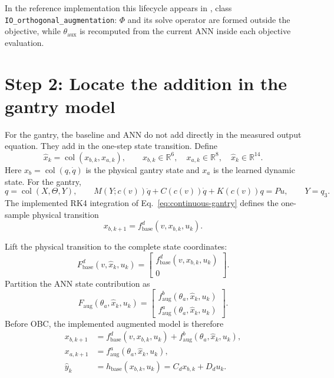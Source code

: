 \documentclass[11pt,a4paper]{article}
\newcommand{\R}{\mathbb{R}}
\newcommand{\col}{\operatorname{col}}
\newcommand{\code}[1]{\texttt{#1}}
\begin{document}
In the reference implementation this lifecycle appears in
, class
\code{IO\_orthogonal\_augmentation}: \(\Phi\) and its solve operator are
formed outside the objective, while \(\theta_{\mathrm{aux}}\) is recomputed
from the current ANN inside each objective evaluation.

\clearpage
\section{Step 2: Locate the addition in the gantry model}

For the gantry, the baseline and ANN do not add directly in the measured
output equation.  They add in the one-step state transition.  Define
\begin{equation}
\widehat x_k=\col(x_{b,k},x_{a,k}),
\qquad
x_{b,k}\in\R^6,\quad x_{a,k}\in\R^8,
\quad \widehat x_k\in\R^{14}.
\end{equation}
Here \(x_b=\col(q,\dot q)\) is the physical gantry state and \(x_a\) is the
learned dynamic state.
For the gantry,
\begin{equation}
q=\col(X,\Theta,Y),
\qquad
M(Y;c(v))\ddot q+C(c(v))\dot q+K(c(v))q=Pu,
\qquad Y=q_3.
\label{eq:continuous-gantry}
\end{equation}
The implemented RK4 integration of
Eq.~\eqref{eq:continuous-gantry} defines the one-sample physical transition
\begin{equation}
x_{b,k+1}=f_{\mathrm{base}}^d(v,x_{b,k},u_k).
\end{equation}

Lift the physical transition to the complete state coordinates:
\begin{equation}
F_{\mathrm{base}}^d(v,\widehat x_k,u_k)
=
\begin{bmatrix}
f_{\mathrm{base}}^d(v,x_{b,k},u_k)\\[1mm]
0
\end{bmatrix}.
\label{eq:lifted-baseline}
\end{equation}
Partition the ANN state contribution as
\begin{equation}
F_{\mathrm{aug}}(\theta_a,\widehat x_k,u_k)
=
\begin{bmatrix}
f_{\mathrm{aug}}^b(\theta_a,\widehat x_k,u_k)\\[1mm]
f_{\mathrm{aug}}^a(\theta_a,\widehat x_k,u_k)
\end{bmatrix}.
\label{eq:partitioned-ann}
\end{equation}
Before OBC, the implemented augmented model is therefore
\begin{equation}
\boxed{
\begin{aligned}
x_{b,k+1}
&=f_{\mathrm{base}}^d(v,x_{b,k},u_k)
  +f_{\mathrm{aug}}^b(\theta_a,\widehat x_k,u_k),\\
x_{a,k+1}
&=f_{\mathrm{aug}}^a(\theta_a,\widehat x_k,u_k),\\
\widehat y_k
&=h_{\mathrm{base}}(x_{b,k},u_k)
 =C_d x_{b,k}+D_d u_k.
\end{aligned}}
\label{eq:gantry-unprojected}
\end{equation}
\end{document}
